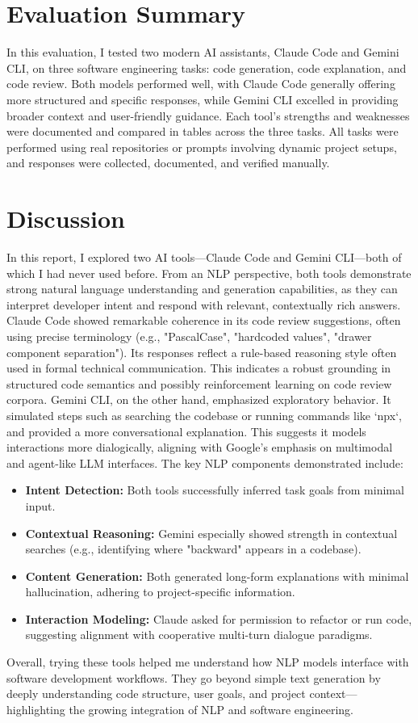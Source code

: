 \documentclass[9.5pt]{article}
\begin{document}
\section{Evaluation Summary}
In this evaluation, I tested two modern AI assistants, Claude Code and Gemini CLI, on three software engineering tasks: code generation, code explanation, and code review. Both models performed well, with Claude Code generally offering more structured and specific responses, while Gemini CLI excelled in providing broader context and user-friendly guidance. Each tool's strengths and weaknesses were documented and compared in tables across the three tasks.
All tasks were performed using real repositories or prompts involving dynamic project setups, and responses were collected, documented, and verified manually.

\section{Discussion}
In this report, I explored two AI tools—Claude Code and Gemini CLI—both of which I had never used before. From an NLP perspective, both tools demonstrate strong natural language understanding and generation capabilities, as they can interpret developer intent and respond with relevant, contextually rich answers.
Claude Code showed remarkable coherence in its code review suggestions, often using precise terminology (e.g., "PascalCase", "hardcoded values", "drawer component separation"). Its responses reflect a rule-based reasoning style often used in formal technical communication. This indicates a robust grounding in structured code semantics and possibly reinforcement learning on code review corpora.
Gemini CLI, on the other hand, emphasized exploratory behavior. It simulated steps such as searching the codebase or running commands like `npx`, and provided a more conversational explanation. This suggests it models interactions more dialogically, aligning with Google's emphasis on multimodal and agent-like LLM interfaces.
The key NLP components demonstrated include:
\begin{itemize}
    \item \textbf{Intent Detection:} Both tools successfully inferred task goals from minimal input.
    \item \textbf{Contextual Reasoning:} Gemini especially showed strength in contextual searches (e.g., identifying where "backward" appears in a codebase).
    \item \textbf{Content Generation:} Both generated long-form explanations with minimal hallucination, adhering to project-specific information.
    \item \textbf{Interaction Modeling:} Claude asked for permission to refactor or run code, suggesting alignment with cooperative multi-turn dialogue paradigms.
\end{itemize}
Overall, trying these tools helped me understand how NLP models interface with software development workflows. They go beyond simple text generation by deeply understanding code structure, user goals, and project context—highlighting the growing integration of NLP and software engineering.
\end{document}
